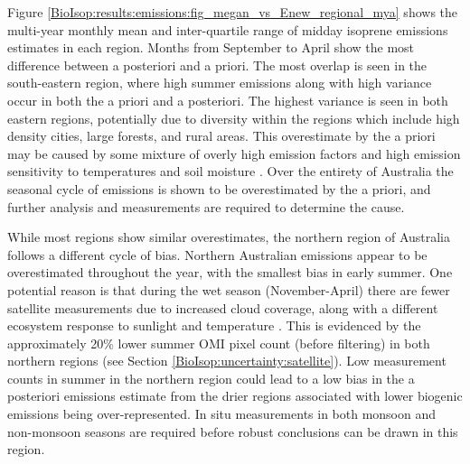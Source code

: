 \documentclass[acp, manuscript]{copernicus}
\newcommand{\parencite}{\citep}
\begin{document}
    
    
    Figure \ref{BioIsop:results:emissions:fig_megan_vs_Enew_regional_mya} shows the multi-year monthly mean and inter-quartile range of midday isoprene emissions estimates in each region. 
    Months from September to April show the most difference between a posteriori and a priori.
    The most overlap is seen in the south-eastern region, where high summer emissions along with high variance occur in both the a priori and a posteriori.
    The highest variance is seen in both eastern regions, potentially due to diversity within the regions which include high density cities, large forests, and rural areas.
    This overestimate by the a priori may be caused by some mixture of overly high emission factors and high emission sensitivity to temperatures and soil moisture \parencite{Emmerson2016,Emmerson2019}.
    Over the entirety of Australia the seasonal cycle of emissions is shown to be overestimated by the a priori, and further analysis and measurements are required to determine the cause.
    
    While most regions show similar overestimates, the northern region of Australia follows a different cycle of bias.
    Northern Australian emissions appear to be overestimated throughout the year, with the smallest bias in early summer.
    One potential reason is that during the wet season (November-April) there are fewer satellite measurements due to increased cloud coverage, along with a different ecosystem response to sunlight and temperature \parencite[e.g.,][]{Surl2018}.
    This is evidenced by the approximately 20\% lower summer OMI pixel count (before filtering) in both northern regions (see Section \ref{BioIsop:uncertainty:satellite}).
    Low measurement counts in summer in the northern region could lead to a low bias in the a posteriori emissions estimate from the drier regions associated with lower biogenic emissions being over-represented.
    In situ measurements in both monsoon and non-monsoon seasons are required before robust conclusions can be drawn in this region.
    
\end{document}

